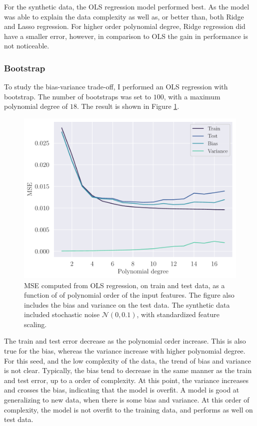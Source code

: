 For the synthetic data, the OLS regression model performed best. As the model was able to explain the data complexity as well as, or better than, both Ridge and Lasso regression. For higher order polynomial degree, Ridge regression did have a smaller error, however, in comparison to OLS the gain in performance is not noticeable.

\subsubsection{Bootstrap}\label{sssec:bootstrap_synthetic}
To study the bias-variance trade-off, I performed an OLS regression with bootstrap. The number of bootstraps was set to $100$, with a maximum polynomial degree of $18$. The result is shown in Figure \ref{fig:ols_bootstrap}.
\begin{figure}[h]
    \centering
    \includegraphics[width=\linewidth]{project-1/latex/figures/ols_bootstrap_100_scaled_N50.pdf}
    \caption{MSE computed from OLS regression, on train and test data, as a function of of polynomial order of the input features. The figure also includes the bias and variance on the test data. The synthetic data included stochastic noise $\mathcal{N}(0, 0.1)$, with standardized feature scaling.}
    \label{fig:ols_bootstrap}
\end{figure}
The train and test error decrease as the polynomial order increase. This is also true for the bias, whereas the variance increase with higher polynomial degree. For this seed, and the low complexity of the data, the trend of bias and variance is not clear. Typically, the bias tend to decrease in the same manner as the train and test error, up to a order of complexity. At this point, the variance increases and crosses the bias, indicating that the model is overfit. A model is good at generalizing to new data, when there is some bias and variance. At this order of complexity, the model is not overfit to the training data, and performs as well on test data.

